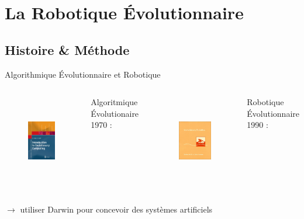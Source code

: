 \documentclass[8pt, handout=show,notes=show]{beamer}
\begin{document}
\section{La Robotique \'Evolutionnaire}
\subsection{Histoire \& Méthode}
\begin{frame}{Algorithmique \'Evolutionnaire et Robotique}

	\vfill
	\begin{columns}
		\begin{figure}[h]
			\begin{center}
				\includegraphics[height=4cm]{images/ec}
			\end{center}
			\caption{\cite{eiben03introductiontoevolutionarycomputing}}
			\label{fig:ec}
		\end{figure} 

		\vfill
		Algoritmique Évolutionaire 1970 : \cite{holland75adaptationnaturalartificialsystem}



		\begin{figure}[h]
			\begin{center}
				\includegraphics[height=4cm]{images/er}
			\end{center}
			\caption{\cite{nolfi00evolrobobiolintetechselfmach}}
			\label{fig:er}
		\end{figure}

		\vfill
		Robotique Évolutionnaire 1990 : \cite{nolfi00evolrobobiolintetechselfmach}
	\end{columns}
	\vfill

	$\rightarrow$ utiliser Darwin pour concevoir des systèmes artificiels
\end{frame}
\end{document}
